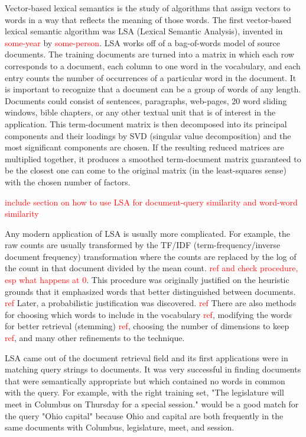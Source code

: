 \documentclass[10pt,letterpaper]{book}
\newcommand{\todo}[1]{\textcolor{red}{#1}}
\begin{document}
Vector-based lexical semantics is the study of algorithms that assign vectors to words in a way that reflects the meaning of those words. The first vector-based lexical semantic algorithm was LSA (Lexical Semantic Analysis), invented in \todo{some-year} by \todo{some-person}. LSA works off of a bag-of-words model of source documents. The training documents are turned into a matrix in which each row corresponds to a document, each column to one word in the vocabulary, and each entry counts the number of occurrences of a particular word in the document. It is important to recognize that a document can be a group of words of any length. Documents could consist of sentences, paragraphs, web-pages, 20 word sliding windows, bible chapters, or any other textual unit that is of interest in the application. This term-document matrix is then decomposed into its principal components and their loadings by SVD (singular value decomposition) and the most significant components are chosen. If the resulting reduced matrices are multiplied together, it produces a smoothed term-document matrix guaranteed to be the closest one can come to the original matrix (in the least-squares sense) with the chosen number of factors.

\todo{include section on how to use LSA for document-query similarity and word-word similarity}

Any modern application of LSA is usually more complicated. For example, the raw counts are usually transformed by the TF/IDF (term-frequency/inverse document frequency) transformation where the counts are replaced by the log of the count in that document divided by the mean count. \todo{ref and check procedure, esp what happens at 0}. This procedure was originally justified on the heuristic grounds that it emphasized words that better distinguished between documents. \todo{ref} Later, a probabilistic justification was discovered. \todo{ref} There are also methods for choosing which words to include in the vocabulary \todo{ref}, modifying the words for better retrieval (stemming) \todo{ref}, choosing the number of dimensions to keep \todo{ref}, and many other refinements to the technique.

LSA came out of the document retrieval field and its first applications were in matching query strings to documents. It was very successful in finding documents that were semantically appropriate but which contained no words in common with the query. For example, with the right training set, "The legislature will meet in Columbus on Thursday for a special session." would be a good match for the query "Ohio capital" because Ohio and capital are both frequently in the same documents with Columbus, legislature, meet, and session.
\end{document}
